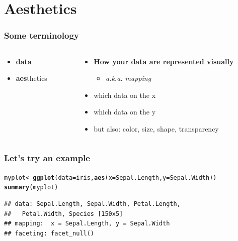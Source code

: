 \documentclass{beamer}\usepackage[]{graphicx}\usepackage[]{color}
\makeatletter
\newcommand{\hlstd}[1]{\textcolor[rgb]{0.345,0.345,0.345}{#1}}%
\newcommand{\hlkwb}[1]{\textcolor[rgb]{0.69,0.353,0.396}{#1}}%
\newcommand{\hlkwc}[1]{\textcolor[rgb]{0.333,0.667,0.333}{#1}}%
\newcommand{\hlkwd}[1]{\textcolor[rgb]{0.737,0.353,0.396}{\textbf{#1}}}%
\newenvironment{kframe}{%
 \def\at@end@of@kframe{}%
 \ifinner\ifhmode%
  \def\at@end@of@kframe{\end{minipage}}%
  \begin{minipage}{\columnwidth}%
 \fi\fi%
 \def\FrameCommand##1{\hskip\@totalleftmargin \hskip-\fboxsep
 \colorbox{shadecolor}{##1}\hskip-\fboxsep
     \hskip-\linewidth \hskip-\@totalleftmargin \hskip\columnwidth}%
 \MakeFramed {\advance\hsize-\width
   \@totalleftmargin\z@ \linewidth\hsize
   \@setminipage}}%
 {\par\unskip\endMakeFramed%
 \at@end@of@kframe}
\newenvironment{knitrout}{}{} %
\makeatother
\begin{document}

\section*{Aesthetics}
\frame{\sectionpage}



\begin{frame}[fragile]
\frametitle{Some terminology}
\begin{columns}[t]

\begin{column}[T]{3cm}
\begin{itemize}
    \item \textbf{\color{gray}data}
    \item \textbf{aes}thetics
\end{itemize}
\end{column}

\begin{column}[T]{8cm}
\begin{itemize}
    \item \textbf{How your data are represented visually}
        \begin{itemize}
        \item \emph{a.k.a. mapping}
        \end{itemize}
    \item which data on the x
    \item which data on the y
    \item but also: {\color{red}color}, {\LARGE{size}}, shape, transparency
\end{itemize}
\end{column}

\end{columns}
\end{frame}


\begin{frame}[fragile]
\frametitle{Let's try an example}
\begin{knitrout}\footnotesize
{}\color{fgcolor}\begin{kframe}
\begin{alltt}
\hlstd{myplot} \hlkwb{<-} \hlkwd{ggplot}\hlstd{(}\hlkwc{data} \hlstd{= iris,} \hlkwd{aes}\hlstd{(}\hlkwc{x} \hlstd{= Sepal.Length,} \hlkwc{y} \hlstd{= Sepal.Width))}
\hlkwd{summary}\hlstd{(myplot)}
\end{alltt}
\begin{verbatim}
## data: Sepal.Length, Sepal.Width, Petal.Length,
##   Petal.Width, Species [150x5]
## mapping:  x = Sepal.Length, y = Sepal.Width
## faceting: facet_null()
\end{verbatim}
\end{kframe}
\end{knitrout}

\end{frame}
\end{document}

